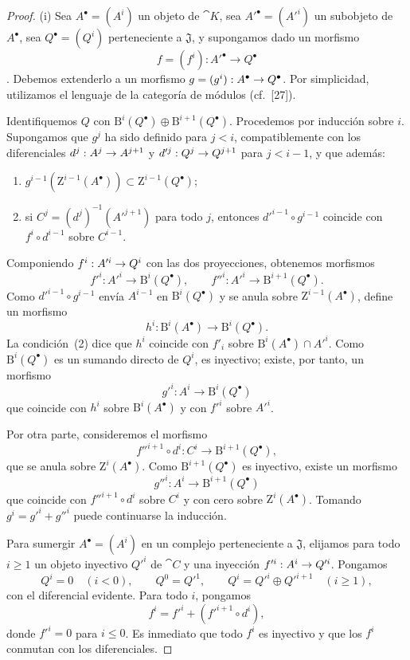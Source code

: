 \documentclass[oneside]{amsart}
\makeatletter
\renewcommand{\leq}{\leqslant}
\renewcommand{\geq}{\geqslant}
\newcommand{\ega@arrow}[2]{\mathchoice{#1}{#2}{#2}{#2}}
\renewcommand{\to}{\ega@arrow{\longrightarrow}{\rightarrow}}
\makeatother
\begin{document}
\begin{proof}
{\rm(i)}
Sea $A^\bullet=(A^i)$ un objeto de $\cat{K}$, sea $A'^\bullet=(A'^i)$ un subobjeto de $A^\bullet$, sea $Q^\bullet=(Q^i)$ perteneciente a $\mathfrak{J}$, y supongamos dado un morfismo
\[
  f=(f^i):A'^\bullet\longrightarrow Q^\bullet
\]
.
Debemos extenderlo a un morfismo $g=(g^i):A^\bullet\to Q^\bullet$.
Por simplicidad, utilizamos el lenguaje de la categoría de módulos (cf.~[27]).

Identifiquemos $Q$ con $\mathrm{B}^i(Q^\bullet)\oplus\mathrm{B}^{i+1}(Q^\bullet)$.
Procedemos por inducción sobre $i$.
Supongamos que $g^j$ ha sido definido para $j<i$, compatiblemente con los diferenciales $d^j:A^j\to A^{j+1}$ y $d'^j:Q^j\to Q^{j+1}$ para $j<i-1$, y que además:
\begin{enumerate}
  \item[{\rm(1)}] $g^{i-1}(\mathrm{Z}^{i-1}(A^\bullet))\subset\mathrm{Z}^{i-1}(Q^\bullet)$;
  \item[{\rm(2)}] si $C^j=(d^j)^{-1}(A'^{j+1})$ para todo $j$, entonces $d'^{i-1}\circ g^{i-1}$ coincide con $f^i\circ d^{i-1}$ sobre $C^{i-1}$.
\end{enumerate}
Componiendo $f^i:A'^i\to Q^i$ con las dos proyecciones, obtenemos morfismos
\[
  f'^i:A'^i\longrightarrow\mathrm{B}^i(Q^\bullet),
  \qquad
  f''^i:A'^i\longrightarrow\mathrm{B}^{i+1}(Q^\bullet).
\]
Como $d'^{i-1}\circ g^{i-1}$ envía $A^{i-1}$ en $\mathrm{B}^i(Q^\bullet)$ y se anula sobre $\mathrm{Z}^{i-1}(A^\bullet)$, define un morfismo
\[
  h^i:\mathrm{B}^i(A^\bullet)\longrightarrow\mathrm{B}^i(Q^\bullet).
\]
La condición~{\rm(2)} dice que $h^i$ coincide con $f'_i$ sobre $\mathrm{B}^i(A^\bullet)\cap A'^i$.
Como $\mathrm{B}^i(Q^\bullet)$ es un sumando directo de $Q^i$, es inyectivo; existe, por tanto, un morfismo
\[
  g'^i:A^i\longrightarrow\mathrm{B}^i(Q^\bullet)
\]
que coincide con $h^i$ sobre $\mathrm{B}^i(A^\bullet)$ y con $f'^i$ sobre $A'^i$.

Por otra parte, consideremos el morfismo
\[
  f''^{i+1}\circ d^i:C^i\longrightarrow\mathrm{B}^{i+1}(Q^\bullet),
\]
que se anula sobre $\mathrm{Z}^i(A^\bullet)$.
Como $\mathrm{B}^{i+1}(Q^\bullet)$ es inyectivo, existe un morfismo
\[
  g''^i:A^i\longrightarrow\mathrm{B}^{i+1}(Q^\bullet)
\]
que coincide con $f''^{i+1}\circ d^i$ sobre $C^i$ y con cero sobre $\mathrm{Z}^i(A^\bullet)$.
Tomando $g^i=g'^i+g''^i$ puede continuarse la inducción.

\smallskip
{}
Para sumergir $A^\bullet=(A^i)$ en un complejo perteneciente a $\mathfrak{J}$, elijamos para todo $i\geq1$ un objeto inyectivo $Q'^i$ de $\cat{C}$ y una inyección $f'^i:A^i\to Q'^i$.
Pongamos
\[
  Q^i=0\quad(i<0),\qquad Q^0=Q'^1,\qquad
  Q^i=Q'^i\oplus Q'^{i+1}\quad(i\geq1),
\]
con el diferencial evidente.
Para todo $i$, pongamos
\[
  f^i=f'^i+(f'^{i+1}\circ d^i),
\]
donde $f'^i=0$ para $i\leq0$.
Es inmediato que todo $f^i$ es inyectivo y que los $f^i$ conmutan con los diferenciales.
\end{proof}
\end{document}
